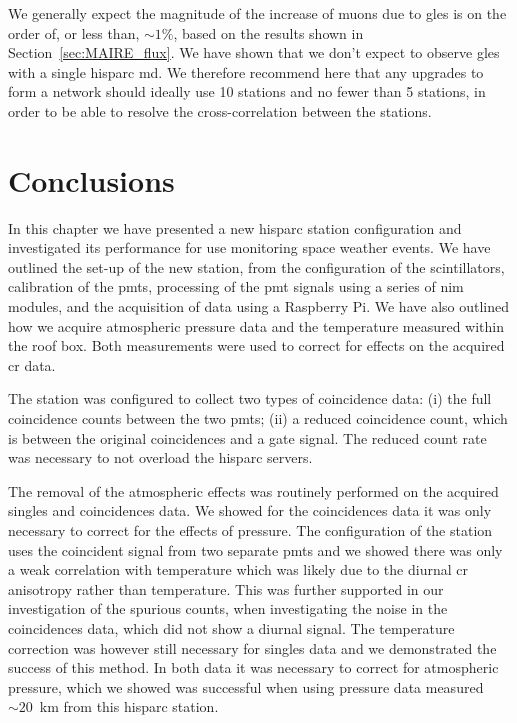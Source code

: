 We generally expect the magnitude of the increase of muons due to \glspl{gle} is on the order of, or less than, $\sim 1 \%$, based on the results shown in Section~\ref{sec:MAIRE_flux}. We have shown that we don't expect to observe \glspl{gle} with a single \gls{hisparc} \gls{md}.  We therefore recommend here that any upgrades to form a network should ideally use 10 stations and no fewer than 5 stations, in order to be able to resolve the cross-correlation between the stations. %


\section{Conclusions}\label{sec:HS_14008_conclusion}

In this chapter we have presented a new \gls{hisparc} station configuration and investigated its performance for use monitoring space weather events. We have outlined the set-up of the new station, from the configuration of the scintillators, calibration of the \glspl{pmt}, processing of the \gls{pmt} signals using a series of \gls{nim} modules, and the acquisition of data using a Raspberry Pi. We have also outlined how we acquire atmospheric pressure data and the temperature measured within the roof box. Both measurements were used to correct for effects on the acquired \gls{cr} data.

The station was configured to collect two types of coincidence data: (i) the full coincidence counts between the two \glspl{pmt}; (ii) a reduced coincidence count, which is between the original coincidences and a gate signal. The reduced count rate was necessary to not overload the \gls{hisparc} servers.

The removal of the atmospheric effects was routinely performed on the acquired singles and coincidences data. We showed for the coincidences data it was only necessary to correct for the effects of pressure. The configuration of the station uses the coincident signal from two separate \glspl{pmt} and we showed there was only a weak correlation with temperature which was likely due to the diurnal \gls{cr} anisotropy rather than temperature. This was further supported in our investigation of the spurious counts, when investigating the noise in the coincidences data, which did not show a diurnal signal. The temperature correction was however still necessary for singles data and we demonstrated the success of this method. In both data it was necessary to correct for atmospheric pressure, which we showed was successful when using pressure data measured  $\sim 20$~km from this \gls{hisparc} station.


